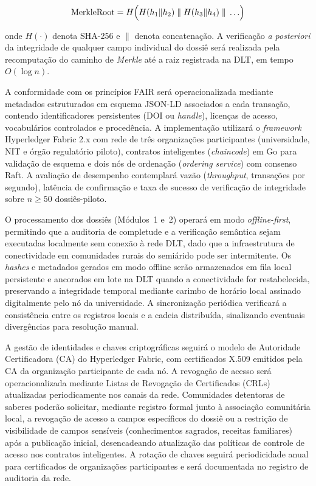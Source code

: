 \documentclass[preprint,12pt,authoryear]{elsarticle}
\begin{document}
\begin{equation}
\text{MerkleRoot} = H\Bigl(H(h_1 \| h_2) \;\|\; H(h_3 \| h_4) \;\|\; \ldots\Bigr)
\label{eq:merkle}
\end{equation}

\noindent onde $H(\cdot)$ denota SHA-256 e $\|$ denota concatenação. A verificação \textit{a posteriori} da integridade de qualquer campo individual do dossiê será realizada pela recomputação do caminho de \textit{Merkle} até a raiz registrada na DLT, em tempo $O(\log n)$.

A conformidade com os princípios FAIR \citep{Wilkinson2016} será operacionalizada mediante metadados estruturados em esquema JSON-LD associados a cada transação, contendo identificadores persistentes (DOI ou \textit{handle}), licenças de acesso, vocabulários controlados e procedência. A implementação utilizará o \textit{framework} Hyperledger Fabric 2.x \citep{Hyperledger2020} com rede de três organizações participantes (universidade, NIT e órgão regulatório piloto), contratos inteligentes (\textit{chaincode}) em Go para validação de esquema e dois nós de ordenação (\textit{ordering service}) com consenso Raft. A avaliação de desempenho contemplará vazão (\textit{throughput}, transações por segundo), latência de confirmação e taxa de sucesso de verificação de integridade sobre $n \geq 50$ dossiês-piloto.

O processamento dos dossiês (Módulos~1 e~2) operará em modo \textit{offline-first}, permitindo que a auditoria de completude e a verificação semântica sejam executadas localmente sem conexão à rede DLT, dado que a infraestrutura de conectividade em comunidades rurais do semiárido pode ser intermitente. Os \textit{hashes} e metadados gerados em modo offline serão armazenados em fila local persistente e ancorados em lote na DLT quando a conectividade for restabelecida, preservando a integridade temporal mediante carimbo de horário local assinado digitalmente pelo nó da universidade. A sincronização periódica verificará a consistência entre os registros locais e a cadeia distribuída, sinalizando eventuais divergências para resolução manual.

A gestão de identidades e chaves criptográficas seguirá o modelo de Autoridade Certificadora (CA) do Hyperledger Fabric, com certificados X.509 emitidos pela CA da organização participante de cada nó. A revogação de acesso será operacionalizada mediante Listas de Revogação de Certificados (CRLs) atualizadas periodicamente nos canais da rede. Comunidades detentoras de saberes poderão solicitar, mediante registro formal junto à associação comunitária local, a revogação de acesso a campos específicos do dossiê ou a restrição de visibilidade de campos sensíveis (conhecimentos sagrados, receitas familiares) após a publicação inicial, desencadeando atualização das políticas de controle de acesso nos contratos inteligentes. A rotação de chaves seguirá periodicidade anual para certificados de organizações participantes e será documentada no registro de auditoria da rede.
\end{document}
